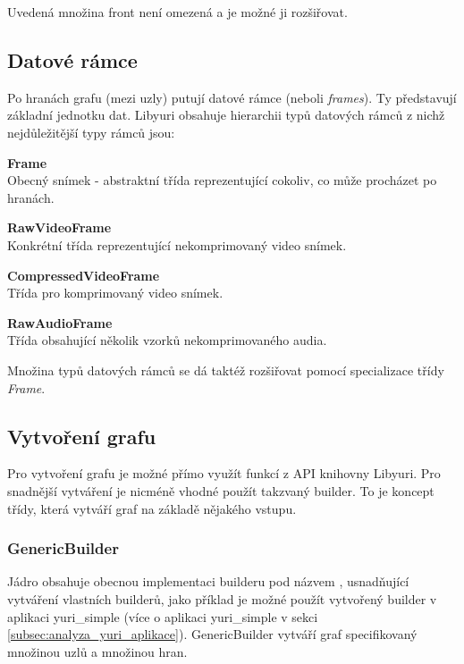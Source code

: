 \documentclass[thesis=M,czech]{FITthesis}[2012/06/26]
\begin{document}
Uvedená množina front není omezená a je možné ji rozšiřovat.

\subsection{Datové rámce} \label{subsec:analyza_yuri_ramce}
Po hranách grafu (mezi uzly) putují datové rámce (neboli \textit{frames}). Ty představují základní jednotku dat. Libyuri obsahuje hierarchii typů datových rámců z nichž nejdůležitější typy rámců jsou:
\begin{description}
  \item \textbf{Frame\\}
Obecný snímek - abstraktní třída reprezentující cokoliv, co může procházet po hranách.
  \item \textbf{RawVideoFrame\\}
Konkrétní třída reprezentující nekomprimovaný video snímek. 
  \item \textbf{CompressedVideoFrame \\}
Třída pro komprimovaný video snímek.
  \item \textbf{RawAudioFrame\\}
Třída obsahující několik vzorků nekomprimovaného audia.
\end{description}

Množina typů datových rámců se dá taktéž rozšiřovat pomocí specializace třídy \textit{Frame}.

\subsection{Vytvoření grafu} \label{subsec:analyza_yuri_vytvoreni}
Pro vytvoření grafu je možné přímo využít funkcí z API knihovny Libyuri. Pro snadnější vytváření je nicméně vhodné použít takzvaný builder. To je koncept třídy, která vytváří graf na základě nějakého vstupu. 

\subsubsection{GenericBuilder} \label{subsec:analyza_yuri_vytvoreni_generic}
Jádro obsahuje obecnou implementaci builderu pod názvem , usnadňující vytváření vlastních builderů, jako příklad je možné použít vytvořený builder  v aplikaci yuri\_simple (více o aplikaci yuri\_simple v sekci \ref{subsec:analyza_yuri_aplikace}). GenericBuilder vytváří graf specifikovaný množinou uzlů a množinou hran.
\end{document}
